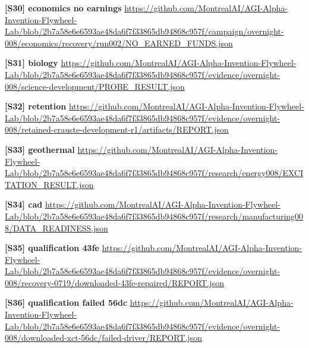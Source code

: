\documentclass[11pt,letterpaper]{article}
\begin{document}
\begin{samepage}\small\textbf{[S30] economics no earnings} \url{https://github.com/MontrealAI/AGI-Alpha-Invention-Flywheel-Lab/blob/2b7a58e6e6593ae48da6f7f33865db94868c957f/campaign/overnight-008/economics/recovery/run002/NO_EARNED_FUNDS.json}\par\normalsize\end{samepage}
\begin{samepage}\small\textbf{[S31] biology} \url{https://github.com/MontrealAI/AGI-Alpha-Invention-Flywheel-Lab/blob/2b7a58e6e6593ae48da6f7f33865db94868c957f/evidence/overnight-008/science-development/PROBE_RESULT.json}\par\normalsize\end{samepage}
\begin{samepage}\small\textbf{[S32] retention} \url{https://github.com/MontrealAI/AGI-Alpha-Invention-Flywheel-Lab/blob/2b7a58e6e6593ae48da6f7f33865db94868c957f/evidence/overnight-008/retained-crauste-development-r1/artifacts/REPORT.json}\par\normalsize\end{samepage}
\begin{samepage}\small\textbf{[S33] geothermal} \url{https://github.com/MontrealAI/AGI-Alpha-Invention-Flywheel-Lab/blob/2b7a58e6e6593ae48da6f7f33865db94868c957f/research/energy008/EXCITATION_RESULT.json}\par\normalsize\end{samepage}
\begin{samepage}\small\textbf{[S34] cad} \url{https://github.com/MontrealAI/AGI-Alpha-Invention-Flywheel-Lab/blob/2b7a58e6e6593ae48da6f7f33865db94868c957f/research/manufacturing008/DATA_READINESS.json}\par\normalsize\end{samepage}
\begin{samepage}\small\textbf{[S35] qualification 43fe} \url{https://github.com/MontrealAI/AGI-Alpha-Invention-Flywheel-Lab/blob/2b7a58e6e6593ae48da6f7f33865db94868c957f/evidence/overnight-008/recovery-0719/downloaded-43fe-repaired/REPORT.json}\par\normalsize\end{samepage}
\begin{samepage}\small\textbf{[S36] qualification failed 56dc} \url{https://github.com/MontrealAI/AGI-Alpha-Invention-Flywheel-Lab/blob/2b7a58e6e6593ae48da6f7f33865db94868c957f/evidence/overnight-008/downloaded-xct-56dc/failed-driver/REPORT.json}\par\normalsize\end{samepage}
\end{document}
